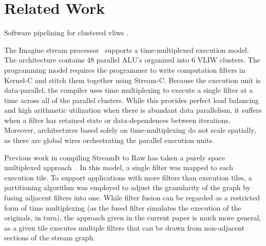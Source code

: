 \section{Related Work}
\label{sec:related}

Software pipelining for clustered vliws \cite{qian02}.

The Imagine stream processor~\cite{rixner98bandwidthefficient}
supports a time-multiplexed execution model.  The architecture
contains 48 parallel ALU's organized into 6 VLIW clusters.  The
programming model requires the programmer to write computation filters
in Kernel-C and stitch them together using Stream-C.  Because the
execution unit is data-parallel, the compiler uses time multiplexing
to execute a single filter at a time across all of the parallel
clusters.  While this provides perfect load balancing and high
arithmetic utilization when there is abundant data parallelism, it
suffers when a filter has retained state or data-dependences between
iterations.  Moreover, architectures based solely on
time-multiplexing do not scale spatially, as there are global wires
orchestrating the parallel execution units. 

Previous work in compiling StreamIt to Raw has taken a purely space
multiplexed approach~\cite{streamit-asplos}.  In this model, a single
filter was mapped to each execution tile.  To support applications
with more filters than execution tiles, a partitioning algorithm was
employed to adjust the granularity of the graph by fusing adjacent
filters into one.  While filter fusion can be regarded as a restricted
form of time multiplexing (as the fused filter simulates the execution
of the originals, in turn), the approach given in the current paper is
much more general, as a given tile executes multiple filters
that can be drawn from non-adjacent sections of the stream graph.



